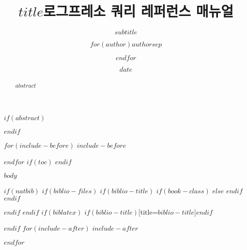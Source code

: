 \documentclass[$if(fontsize)$$fontsize$,$endif$$if(lang)$$lang$,$endif$$if(papersize)$$papersize$,$endif$$for(classoption)$$classoption$$sep$,$endfor$]{$documentclass$}
\title{$title$}
\subtitle{$subtitle$}
\author{$for(author)$$author$$sep$ \and $endfor$}
\date{$date$}
\begin{document}
\title{로그프레소 쿼리 레퍼런스 매뉴얼}
\maketitle

$if(abstract)$
\begin{abstract}
$abstract$
\end{abstract}
$endif$

$for(include-before)$
$include-before$

$endfor$
$if(toc)$
{
\def\contentsname{목차}
\hypersetup{linkcolor=black}
\setcounter{tocdepth}{$toc-depth$}
\tableofcontents
\newpage
}
$endif$

\def\figurename{그림}

$body$

$if(natbib)$
$if(biblio-files)$
$if(biblio-title)$
$if(book-class)$
\renewcommand\bibname{$biblio-title$}
$else$
\renewcommand\refname{$biblio-title$}
$endif$
$endif$


$endif$
$endif$
$if(biblatex)$
\printbibliography$if(biblio-title)$[title=$biblio-title$]$endif$

$endif$
$for(include-after)$
$include-after$

$endfor$
\end{document}
